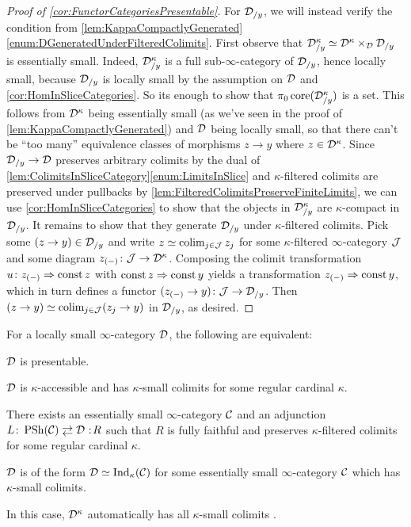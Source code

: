 \begin{proof}[Proof of \cref{cor:FunctorCategoriesPresentable}]
	For $\mathcal{D}_{/y}$, we will instead verify the condition from \cref{lem:KappaCompactlyGenerated}\cref{enum:DGeneratedUnderFilteredColimits}. First observe that $\mathcal{D}^\kappa_{/y}\simeq \mathcal{D}^\kappa\times_{\mathcal{D}}\mathcal{D}_{/y}$ is essentially small. Indeed, $\mathcal{D}^\kappa_{/y}$ is a full sub-$\infty$-category of $\mathcal{D}_{/y}$, hence locally small, because $\mathcal{D}_{/y}$ is locally small by the assumption on $\mathcal{D}$ and \cref{cor:HomInSliceCategories}. So its enough to show that $\pi_0\operatorname{core}(\mathcal{D}^\kappa_{/y})$ is a set. This follows from $\mathcal{D}^\kappa$ being essentially small (as we've seen in the proof of \cref{lem:KappaCompactlyGenerated}) and $\mathcal{D}$ being locally small, so that there can't be \enquote{too many} equivalence classes of morphisms $z\rightarrow y$ where $z\in\mathcal{D}^\kappa$. Since $\mathcal{D}_{/y}\rightarrow\mathcal{D}$ preserves arbitrary colimits by the dual of \cref{lem:ColimitsInSliceCategory}\cref{enum:LimitsInSlice} and $\kappa$-filtered colimits are preserved under pullbacks by \cref{lem:FilteredColimitsPreserveFiniteLimits}, we can use \cref{cor:HomInSliceCategories} to show that the objects in $\mathcal{D}^\kappa_{/y}$ are $\kappa$-compact in $\mathcal{D}_{/y}$. It remains to show that they generate $\mathcal{D}_{/y}$ under $\kappa$-filtered colimits. Pick some $(z\rightarrow y)\in\mathcal{D}_{/y}$ and write $z\simeq\operatorname*{colim}_{j\in\mathcal{J}}z_j$ for some $\kappa$-filtered $\infty$-category $\mathcal{J}$ and some diagram $z_{(-)}\colon\mathcal{J}\rightarrow\mathcal{D}^\kappa$. Composing the colimit transformation $u\colon z_{(-)}\Rightarrow \operatorname{const} z$ with $\operatorname{const} z\Rightarrow \operatorname{const} y$ yields a transformation $z_{(-)}\Rightarrow \operatorname{const} y$, which in turn defines a functor $(z_{(-)}\rightarrow y)\colon \mathcal{J}\rightarrow \mathcal{D}_{/y}$. Then $(z\rightarrow y)\simeq \operatorname*{colim}_{j\in\mathcal{J}}(z_j\rightarrow y)$ in $\mathcal{D}_{/y}$, as desired.
\end{proof}
\begin{lem}\label{lem:Presentable}
	For a locally small $\infty$-category $\mathcal{D}$, the following are equivalent:
	\begin{alphanumerate}
		\item $\mathcal{D}$ is presentable.\label{enum:DIsPresentable}
		\item $\mathcal{D}$ is $\kappa$-accessible and has $\kappa$-small colimits for some regular cardinal $\kappa$.\label{enum:DHasKappaSmallColimits}
		\item \!There exists an essentially small $\infty$-category $\mathcal{C}$ and an adjunction $L\colon \PSh(\Cc)\shortdoublelrmorphism \Dd\noloc R$ such that $R$ is fully faithful and preserves $\kappa$-filtered colimits for some regular cardinal $\kappa$.\label{enum:AccessibleLocalisation}
		\item $\mathcal{D}$ is of the form $\mathcal{D}\simeq\mathrm{Ind}_\kappa(\mathcal{C})$ for some essentially small $\infty$-category $\mathcal{C}$ which has $\kappa$-small colimits.\label{enum:DCHasKappaSmallColimits}
	\end{alphanumerate}
	In this case, $\mathcal{D}^\kappa$ automatically has all $\kappa$-small colimits .
\end{lem}

